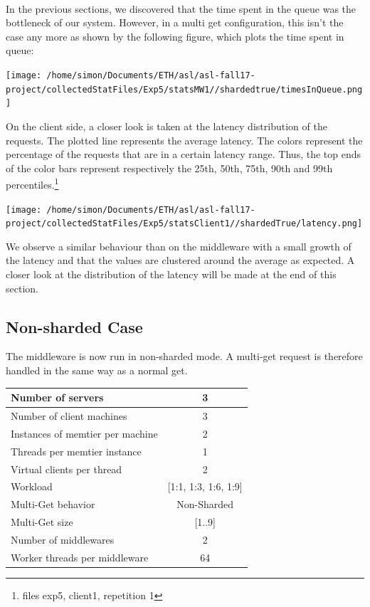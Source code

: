 \documentclass[11pt,a4paper]{article}
\begin{document}
\\
In the previous sections, we discovered that the time spent in the queue was the bottleneck of our system. However, in a multi get configuration, this isn't the case any more as shown by the following figure, which plots the time spent in queue:  
 \begin{center}
\texttt{[image: /home/simon/Documents/ETH/asl/asl-fall17-project/collectedStatFiles/Exp5/statsMW1//shardedtrue/timesInQueue.png]}
\end{center}


On the client side, a closer look is taken at the latency distribution of the requests. The plotted line represents the average latency. The colors represent the percentage of the requests that are in a certain latency range. Thus, the top ends of the color bars represent respectively the 25th, 50th, 75th, 90th and 99th percentiles.\footnote{files exp5, client1, repetition 1} 
  
 \begin{center}
\texttt{[image: /home/simon/Documents/ETH/asl/asl-fall17-project/collectedStatFiles/Exp5/statsClient1//shardedTrue/latency.png]}
\end{center}

We observe a similar behaviour than on the middleware with a small growth of the latency and that the values are clustered around the average as expected. A closer look at the distribution of the latency will be made at the end of this section. 

\subsection{Non-sharded Case}

The middleware is now run in non-sharded mode. A multi-get request is therefore handled in the same way as a normal get. 

\begin{center}
	\scriptsize{
		\begin{tabular}{|l|c|}
			\hline Number of servers                & 3                       \\ 
			\hline Number of client machines        & 3                       \\ 
			\hline Instances of memtier per machine & 2                       \\ 
			\hline Threads per memtier instance     & 1                       \\
			\hline Virtual clients per thread       & 2                		 \\ 
			\hline Workload                         & [1:1, 1:3, 1:6, 1:9]             \\
			\hline Multi-Get behavior               & Non-Sharded             \\
			\hline Multi-Get size                   & [1..9]                  \\
			\hline Number of middlewares            & 2                       \\
			\hline Worker threads per middleware    & 64 \\
			\hline 
		\end{tabular}
	} 
\end{center}
\end{document}

